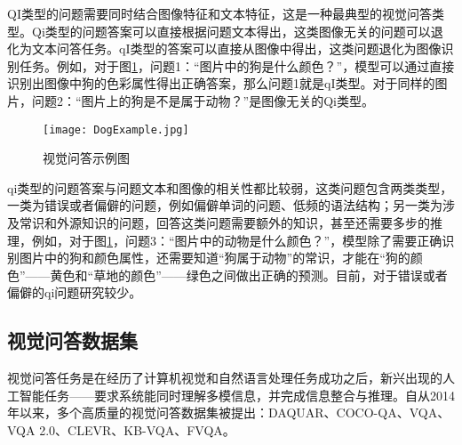QI类型的问题需要同时结合图像特征和文本特征，这是一种最典型的视觉问答类型。Qi类型的问题答案可以直接根据问题文本得出，这类图像无关的问题可以退化为文本问答任务。qI类型的答案可以直接从图像中得出，这类问题退化为图像识别任务。例如，对于图\ref{DogExample}，问题1：“图片中的狗是什么颜色？”，模型可以通过直接识别出图像中狗的色彩属性得出正确答案，那么问题1就是qI类型。对于同样的图片，问题2：“图片上的狗是不是属于动物？”是图像无关的Qi类型。
\begin{figure}[H]
	\texttt{[image: DogExample.jpg]}
	\caption{视觉问答示例图}
	\label{DogExample}
\end{figure}

qi类型的问题答案与问题文本和图像的相关性都比较弱，这类问题包含两类类型，一类为错误或者偏僻的问题，例如偏僻单词的问题、低频的语法结构；另一类为涉及常识和外源知识的问题，回答这类问题需要额外的知识，甚至还需要多步的推理，例如，对于图\ref{DogExample}，问题3：“图片中的动物是什么颜色？”，模型除了需要正确识别图片中的狗和颜色属性，还需要知道“狗属于动物”的常识，才能在“狗的颜色”——黄色和“草地的颜色”——绿色之间做出正确的预测。目前，对于错误或者偏僻的qi问题研究较少。

\subsection{视觉问答数据集}
视觉问答任务是在经历了计算机视觉和自然语言处理任务成功之后，新兴出现的人工智能任务——要求系统能同时理解多模信息，并完成信息整合与推理。自从2014年以来，多个高质量的视觉问答数据集被提出：DAQUAR、COCO-QA、VQA、VQA 2.0、CLEVR、KB-VQA、FVQA。

